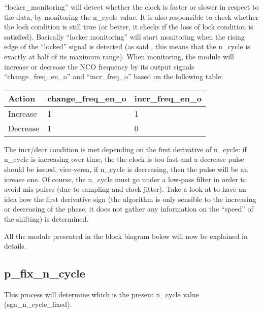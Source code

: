 \documentclass[letterpaper,10pt,english,openany,oneside]{sphinxmanual}
\begin{document}
“locker\_monitoring” will detect whether the clock is faster or slower in respect to the data, by monitoring the n\_cycle value. It is also responsible to check whether the lock condition is still true (or better, it checks if the loss of lock condition is satisfied).
Basically “locker monitoring” will start monitoring when the rising edge of the “locked” signal is detected (as said {\hyperref[\detokenize{code_explanation/phase_detector:locker-manager-ref}]{}} , this means that the n\_cycle is exactly at half of its maximum range). When monitoring, the module will increase or decrease the NCO frequency by its output signals “change\_freq\_en\_o” and “incr\_freq\_o” based on the following table:


\begin{savenotes}\sphinxattablestart
\centering
\begin{tabulary}{\linewidth}[t]{|T|T|T|}
\hline
\sphinxstyletheadfamily 
Action
&\sphinxstyletheadfamily 
change\_freq\_en\_o
&\sphinxstyletheadfamily 
incr\_freq\_en\_o
\\
\hline
Increase
&
1
&
1
\\
\hline
Decrease
&
1
&
0
\\
\hline
\end{tabulary}
\par
\sphinxattableend\end{savenotes}

The incr/decr condition is met depending on the first derivative of n\_cycle: if n\_cycle is increasing over time, the the clock is too fast and a decrease pulse should be issued, vice-versa, if n\_cycle is decreasing, then the pulse will be an icrease one. Of course, the n\_cycle must go under a low-pass filter in order to avoid mis-pulses (due to sampling and clock jitter). Take a look at {\hyperref[\detokenize{code_explanation/phase_detector:p-phase-shift-counter-ref}]{}} to have an idea how the first derivative sign (the algorithm is only sensible to the increasing or decreasing of the phase, it does not gather any information on the “speed” of the shifting) is determined.

All the module presented in the block biagram below will now be explained in details.


\subsection{p\_fix\_n\_cycle}
\label{\detokenize{code_explanation/phase_detector:p-fix-n-cycle}}
This process will determine which is the present n\_cycle value (sgn\_n\_cycle\_fixed).
\end{document}
